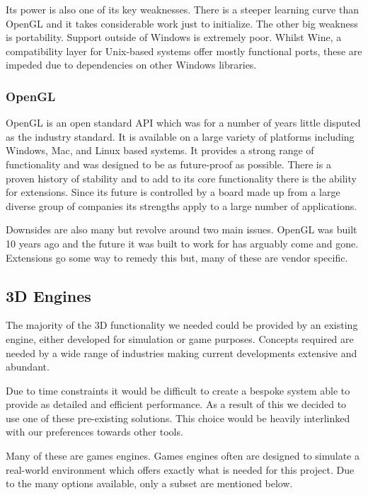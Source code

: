 Its power is also one of its key weaknesses. There is a steeper learning
curve than OpenGL and it takes considerable work just to initialize.
The other big weakness is portability. Support outside of Windows is extremely poor. 
Whilst Wine, a compatibility layer for Unix-based
systems offer mostly functional ports, these are impeded due to dependencies
on other Windows libraries.


\subsubsection{OpenGL}

OpenGL is an open standard API which was for a number of years little
disputed as the industry standard. It is available on a large variety
of platforms including Windows, Mac, and Linux based systems. It provides
a strong range of functionality and was designed to be as future-proof
as possible. There is a proven history of stability and to add to
its core functionality there is the ability for extensions. Since
its future is controlled by a board made up from a large diverse group
of companies its strengths apply to a large number of applications.

Downsides are also many but revolve around two main issues. OpenGL
was built 10 years ago and the future it was built to work for has
arguably come and gone. Extensions go some way to remedy this but,
many of these are vendor specific.


\subsection{3D Engines}

The majority of the 3D functionality we needed could be provided by
an existing engine, either developed for simulation or game purposes.
Concepts required are needed by a wide range of industries making
current developments extensive and abundant.

Due to time constraints it would be difficult to create
a bespoke system able to provide as detailed and efficient performance.
As a result of this we decided to use one of these pre-existing solutions.
This choice would be heavily interlinked with our preferences towards
other tools.

Many of these are games engines. Games engines often are
designed to simulate a real-world environment which offers exactly
what is needed for this project. Due to the many options available,
only a subset are mentioned below.


